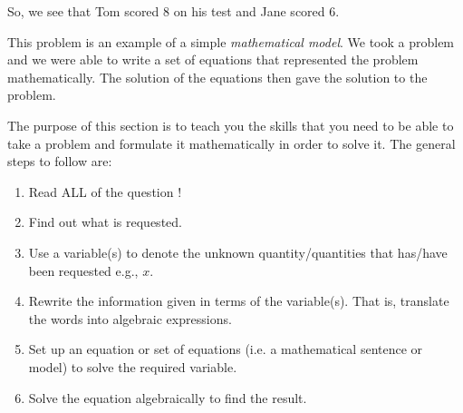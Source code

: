         \label{m39262*id161871}So, we see that Tom scored 8 on his test and Jane scored 6.\par 
        \label{m39262*id161878}This problem is an example of a simple \textsl{mathematical model}. We took a problem and we were able to write a set of equations that represented the problem mathematically. The solution of the equations then gave the solution to the problem.\par 
      \label{m39262*uid103}
            \nopagebreak
        \label{m39262*id161898}The purpose of this section is to teach you the skills that you need to be able to take a problem and formulate it mathematically in order to solve it. The general steps to follow are:\par 
        \label{m39262*id161903}\begin{enumerate}[noitemsep, label=\textbf{\arabic*}. ] 
            \label{m39262*uid104}\item Read ALL of the question !
\label{m39262*uid105}\item Find out what is requested.
\label{m39262*uid106}\item Use a variable(s) to denote the unknown quantity/quantities that has/have been requested e.g., $x$.
\label{m39262*uid107}\item Rewrite the information given in terms of the variable(s). That is, translate the words into algebraic expressions. 
\label{m39262*uid108}\item Set up an equation or set of equations (i.e. a mathematical sentence or model) to solve the required variable.
\label{m39262*uid109}\item Solve the equation algebraically to find the result.
\end{enumerate}
      \label{m39262*uid110}
